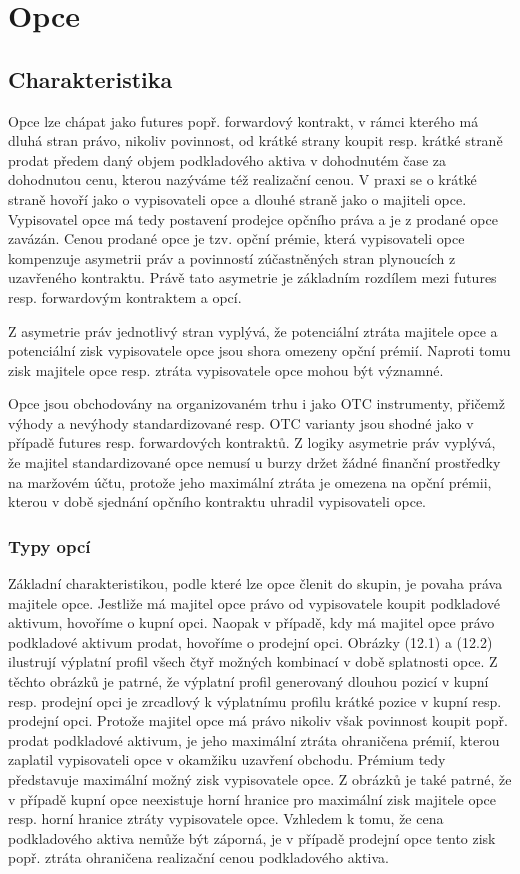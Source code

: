 \documentclass[a4paper]{book}
\begin{document}
\section{Opce}

\subsection{Charakteristika}

Opce lze chápat jako futures popř. forwardový kontrakt, v rámci kterého má dluhá stran právo, nikoliv povinnost, od krátké strany koupit resp. krátké straně prodat předem daný objem podkladového aktiva v dohodnutém čase za dohodnutou cenu, kterou nazýváme též realizační cenou. V praxi se o krátké straně hovoří jako o vypisovateli opce a dlouhé straně jako o majiteli opce. Vypisovatel opce má tedy postavení prodejce opčního práva a je z prodané opce zavázán. Cenou prodané opce je tzv. opční prémie, která vypisovateli opce kompenzuje asymetrii práv a povinností zúčastněných stran plynoucích z uzavřeného kontraktu. Právě tato asymetrie je základním rozdílem mezi futures resp. forwardovým kontraktem a opcí.

Z asymetrie práv jednotlivý stran vyplývá, že potenciální ztráta majitele opce a potenciální zisk vypisovatele opce jsou shora omezeny opční prémií. Naproti tomu zisk majitele opce resp. ztráta vypisovatele opce mohou být významné.

Opce jsou obchodovány na organizovaném trhu i jako OTC instrumenty, přičemž výhody a nevýhody standardizované resp. OTC varianty jsou shodné jako v případě futures resp. forwardových kontraktů. Z logiky asymetrie práv vyplývá, že majitel standardizované opce nemusí u burzy držet žádné finanční prostředky na maržovém účtu, protože jeho maximální ztráta je omezena na opční prémii, kterou v době sjednání opčního kontraktu uhradil vypisovateli opce.

\subsubsection{Typy opcí}

Základní charakteristikou, podle které lze opce členit do skupin, je povaha práva majitele opce. Jestliže má majitel opce právo od vypisovatele koupit podkladové aktivum, hovoříme o kupní opci. Naopak v případě, kdy má majitel opce právo podkladové aktivum prodat, hovoříme o prodejní opci. Obrázky (12.1) a (12.2) ilustrují výplatní profil všech čtyř možných kombinací v době splatnosti opce. Z těchto obrázků je patrné, že výplatní profil generovaný dlouhou pozicí v kupní resp. prodejní opci je zrcadlový k výplatnímu profilu krátké pozice v kupní resp. prodejní opci. Protože majitel opce má právo nikoliv však povinnost koupit popř. prodat podkladové aktivum, je jeho maximální ztráta ohraničena prémií, kterou zaplatil vypisovateli opce v okamžiku uzavření obchodu. Prémium tedy představuje maximální možný zisk vypisovatele opce. Z obrázků je také patrné, že v případě kupní opce neexistuje horní hranice pro maximální zisk majitele opce resp. horní hranice ztráty vypisovatele opce. Vzhledem k tomu, že cena podkladového aktiva nemůže být záporná, je v případě prodejní opce tento zisk popř. ztráta ohraničena realizační cenou podkladového aktiva.
\end{document}
